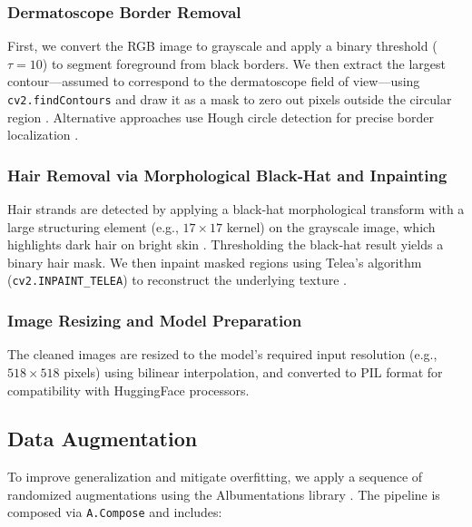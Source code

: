 \subsubsection{Dermatoscope Border Removal}
First, we convert the RGB image to grayscale and apply a binary threshold (\(\tau=10\)) to segment foreground from black borders. We then extract the largest contour—assumed to correspond to the dermatoscope field of view—using \texttt{cv2.findContours} and draw it as a mask to zero out pixels outside the circular region \cite{Valous2017}. Alternative approaches use Hough circle detection for precise border localization \cite{Pewton2022}.

\subsubsection{Hair Removal via Morphological Black‐Hat and Inpainting}
Hair strands are detected by applying a black‐hat morphological transform with a large structuring element (e.g., \(17\times17\) kernel) on the grayscale image, which highlights dark hair on bright skin \cite{Jaworek2013}. Thresholding the black‐hat result yields a binary hair mask. We then inpaint masked regions using Telea’s algorithm (\texttt{cv2.INPAINT\_TELEA}) to reconstruct the underlying texture \cite{Khan2024, SharpRazor2023}.

\subsubsection{Image Resizing and Model Preparation}
The cleaned images are resized to the model’s required input resolution (e.g., \(518\times518\) pixels) using bilinear interpolation, and converted to PIL format for compatibility with HuggingFace processors.

\subsection{Data Augmentation}
To improve generalization and mitigate overfitting, we apply a sequence of randomized augmentations using the Albumentations library \cite{Buslaev2018, Buslaev2020, AlbumentationsWiki2024}. The pipeline is composed via \texttt{A.Compose} and includes:

